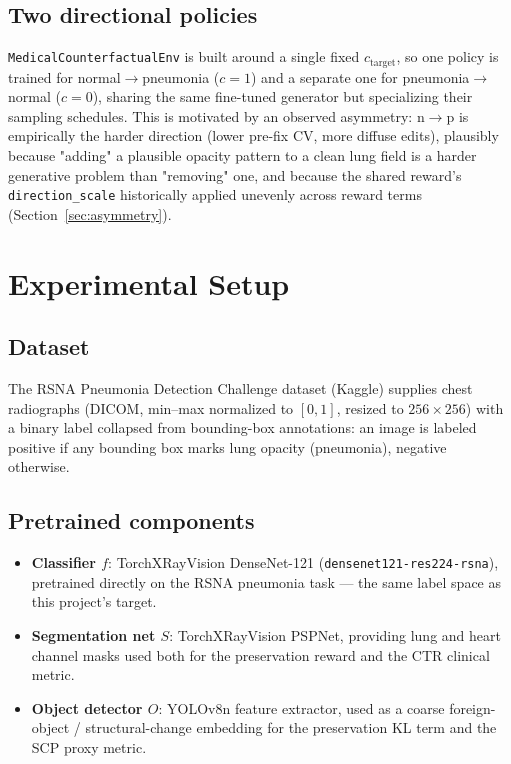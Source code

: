 \documentclass[11pt]{article}
\begin{document}
\subsection{Two directional policies}

\texttt{MedicalCounterfactualEnv} is built around a single fixed
$c_{\text{target}}$, so one policy is trained for
normal$\to$pneumonia ($c=1$) and a separate one for
pneumonia$\to$normal ($c=0$), sharing the same fine-tuned generator but
specializing their sampling schedules. This is motivated by an observed
asymmetry: n$\to$p is empirically the harder direction (lower
pre-fix CV, more diffuse edits), plausibly because "adding" a
plausible opacity pattern to a clean lung field is a harder generative
problem than "removing" one, and because the shared reward's
\texttt{direction\_scale} historically applied unevenly across reward
terms (Section~\ref{sec:asymmetry}).

\section{Experimental Setup}

\subsection{Dataset}

The RSNA Pneumonia Detection Challenge dataset (Kaggle) supplies chest
radiographs (DICOM, min–max normalized to $[0,1]$, resized to
$256\times256$) with a binary label collapsed from bounding-box
annotations: an image is labeled positive if any bounding box marks lung
opacity (pneumonia), negative otherwise.

\subsection{Pretrained components}

\begin{itemize}[leftmargin=*]
  \item \textbf{Classifier $f$}: TorchXRayVision DenseNet-121
        (\texttt{densenet121-res224-rsna}), pretrained directly on the
        RSNA pneumonia task — the same label space as this project's
        target.
  \item \textbf{Segmentation net $S$}: TorchXRayVision PSPNet, providing
        lung and heart channel masks used both for the preservation
        reward and the CTR clinical metric.
  \item \textbf{Object detector $O$}: YOLOv8n feature extractor, used as
        a coarse foreign-object / structural-change embedding for the
        preservation KL term and the SCP proxy metric.
\end{itemize}
\end{document}
